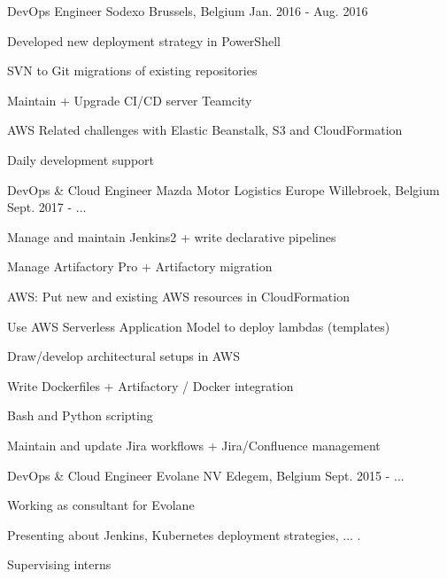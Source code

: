 \begin{cventries}
  \cventry
    {DevOps Engineer} %
    {Sodexo} %
    {Brussels, Belgium} %
    {Jan. 2016 - Aug. 2016} %
    {
      \begin{cvitems} %
        \item {Developed new deployment strategy in PowerShell}
        \item {SVN to Git migrations of existing repositories}
        \item {Maintain + Upgrade CI/CD server Teamcity}
        \item {AWS Related challenges with Elastic Beanstalk, S3 and CloudFormation}
        \item {Daily development support}
      \end{cvitems}
    }

  \cventry
    {DevOps \& Cloud Engineer} %
    {Mazda Motor Logistics Europe} %
    {Willebroek, Belgium} %
    {Sept. 2017 - ...} %
    {
      \begin{cvitems} %
        \item {Manage and maintain Jenkins2 + write declarative pipelines}
        \item {Manage Artifactory Pro + Artifactory migration}
        \item {AWS: Put new and existing AWS resources in CloudFormation}
        \item {Use AWS Serverless Application Model to deploy lambdas (templates)}
        \item {Draw/develop architectural setups in AWS}
        \item {Write Dockerfiles + Artifactory / Docker integration}
        \item {Bash and Python scripting}
        \item {Maintain and update Jira workflows + Jira/Confluence management}
      \end{cvitems}
    }

  \cventry
    {DevOps \& Cloud Engineer} %
    {Evolane NV} %
    {Edegem, Belgium} %
    {Sept. 2015 - ...} %
    {
      \begin{cvitems} %
        \item {Working as consultant for Evolane}
        \item {Presenting about Jenkins, Kubernetes deployment strategies, ... .}
        \item {Supervising interns}
      \end{cvitems}
    }

\end{cventries}
